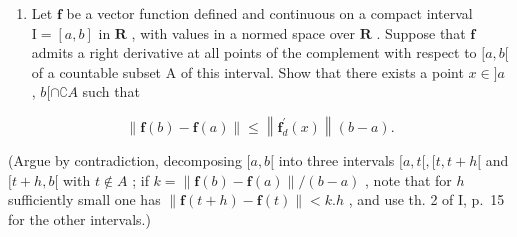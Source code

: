 \begin{enumerate}
\def\labelenumi{\arabic{enumi})}
\setcounter{enumi}{13}
\tightlist
\item
  Let \(\mathbf{f}\) be a vector function defined and continuous on a compact interval \(\mathrm{I} = [a, b]\) in \(\mathbf{R}\) , with values in a normed space over \(\mathbf{R}\) . Suppose that \(\mathbf{f}\) admits a right derivative at all points of the complement with respect to \([a, b[\) of a countable subset A of this interval. Show that there exists a point \(x \in ]a\) , \(b[\cap ∁A\) such that
\end{enumerate}

\[
\left\| \mathbf {f} (b) - \mathbf {f} (a) \right\| \leqslant \left\| \mathbf {f} _ {d} ^ {\prime} (x) \right\| (b - a).
\]

(Argue by contradiction, decomposing \([a, b[\) into three intervals \([a, t[, [t, t + h[\) and \([t + h, b[\) with \(t \notin A\) ; if \(k = \| \mathbf{f}(b) - \mathbf{f}(a)\| / (b - a)\) , note that for \(h\) sufficiently small one has \(\| \mathbf{f}(t + h) - \mathbf{f}(t)\| < k.h\) , and use th. 2 of I, p.~15 for the other intervals.)

\setcounter{exercisegroup}{2}

